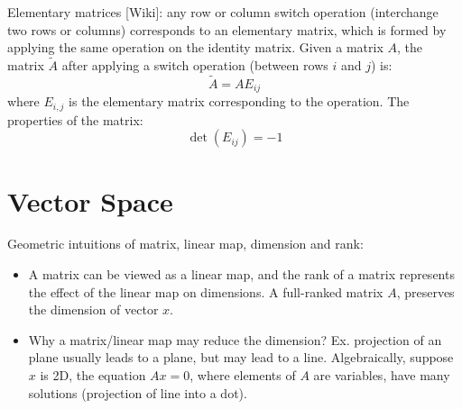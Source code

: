 \documentclass{report}
\begin{document}
Elementary matrices [Wiki]: any row or column switch operation (interchange two rows or columns) corresponds to an elementary matrix, which is formed by applying the same operation on the identity matrix. Given a matrix $A$, the matrix $\tilde{A}$ after applying a switch operation (between rows $i$ and $j$) is: 
\begin{equation}
\tilde{A} = A E_{ij}
\end{equation}
where $E_{i,j}$ is the elementary matrix corresponding to the operation. The properties of the matrix: 
\begin{equation}
\det(E_{ij}) = -1
\end{equation}
\section{Vector Space}

Geometric intuitions of matrix, linear map, dimension and rank: 
\begin{itemize}
	\item A matrix can be viewed as a linear map, and the rank of a matrix represents the effect of the linear map on dimensions. A full-ranked matrix $A$, preserves the dimension of vector $x$. 
	
	\item Why a matrix/linear map may reduce the dimension? Ex. projection of an plane usually leads to a plane, but may lead to a line. Algebraically, suppose $x$ is 2D, the equation $Ax = 0$, where elements of $A$ are variables, have many solutions (projection of line into a dot). 
\end{itemize}
\end{document}
